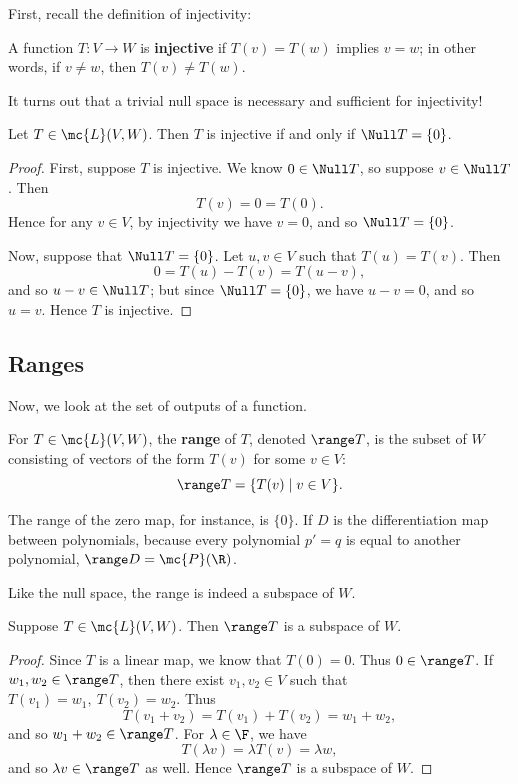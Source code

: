 \documentclass[math0540-lecture-notes.tex]{subfiles}
\begin{document}
First, recall the definition of injectivity:
\begin{definition}[Injectivity]{}
  A function $T:V\to W$ is \textbf{injective} if $T(v)=T(w)$ implies $v=w$; in other words, if
  $v\neq w$, then $T(v)\neq T(w)$.
\end{definition}

It turns out that a trivial null space is necessary and sufficient for injectivity!
\begin{proposition}{}
  Let $T\in \mc{L}(V,W)$. Then $T$ is injective if and only if $ \Null T = \{ 0 \}$.
\end{proposition}
\begin{proof}[Proof]
  First, suppose $T$ is injective. We know $0\in \Null T$, so suppose $v\in \Null T$. Then \[
    T(v)=0=T(0)
  .\] Hence for any $v\in V$, by injectivity we have $v=0$, and so $ \Null T=\{ 0 \}$.

  Now, suppose that $\Null T = \{ 0 \}$. Let $u,v\in V$ such that $T(u)=T(v)$. Then \[
    0 = T(u)-T(v)=T(u-v)
  ,\] and so $u-v\in \Null T$; but since $ \Null T = \{ 0 \}$, we have $u-v=0$, and so $u=v$. Hence
  $T$ is injective.
\end{proof}

\subsection{Ranges}
Now, we look at the set of outputs of a function.

\begin{definition}[Range]{}
  For $T\in \mc{L}(V,W)$, the \textbf{range} of $T$, denoted $\range T$, is the subset of $W$ 
  consisting of vectors of the form $T(v)$ for some $v\in V$: \[
    \range T = \{T(v) \mid v\in V\} 
  .\] 
\end{definition}

The range of the zero map, for instance, is $\{ 0 \}$. If $D$ is the differentiation map between
polynomials, because every polynomial $p'=q$ is equal to another polynomial, $\range D =
\mc{P}(\R)$.

Like the null space, the range is indeed a subspace of $W$.
\begin{proposition}{}
  Suppose $T \in \mc{L}(V,W)$. Then $\range T$ is a subspace of $W$.
\end{proposition}
\begin{proof}[Proof]
  Since $T$ is a linear map, we know that $T(0)=0$. Thus $0\in \range T$. If $ w_1,w_2\in \range T$,
  then there exist $ v_1,v_2\in V$ such that $T(v_1)=w_1,\ T(v_2)=w_2$. Thus \[
    T(v_1+v_2)=T(v_1)+T(v_2)=w_1+w_2
  ,\] and so $w_1+w_2\in \range T$. For $\lambda\in \F$, we have \[
  T(\lambda v)=\lambda T(v)=\lambda w
  ,\] and so $\lambda v\in \range T$ as well. Hence $\range T$ is a subspace of $W$.
\end{proof}
\end{document}
